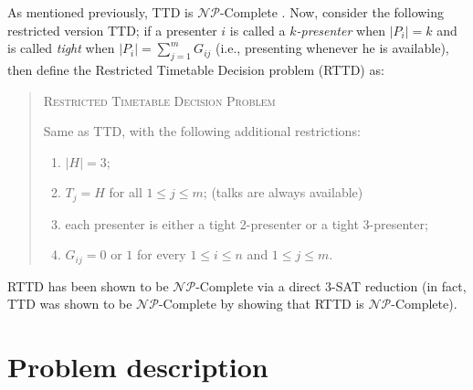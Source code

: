 \documentclass[]{article}
\theoremstyle{definition}
\theoremstyle{remark}
\numberwithin{equation}{section}
\newcommand{\cNP}{$\mathcal{NP}$}
\begin{document}
As mentioned previously, TTD is \cNP-Complete \cite{even76}. Now, consider the following restricted version TTD; if a presenter $i$ is called a $k$\textit{-presenter} when $|P_i|=k$ and is called \textit{tight} when $|P_i|=\sum\limits_{j=1}^{m} G_{ij}$ (i.e., presenting whenever he is available), then define the Restricted Timetable Decision problem (RTTD) as:
\begin{quote}
	\textsc{Restricted Timetable Decision Problem}
	
	Same as TTD, with the following additional restrictions:
	\begin{enumerate}
		\item $|H|=3$;
		\item $T_j = H$ for all $1 \le j \le m$; (talks are always available)
		\item each presenter is either a tight 2-presenter or a tight 3-presenter;
		\item $G_{ij}=0$ or $1$ for every $1 \le i \le n$ and $1 \le j \le m$.
	\end{enumerate}
\end{quote}
RTTD has been shown to be \cNP-Complete via a direct 3-SAT reduction \cite{even76} (in fact, TTD was shown to be \cNP-Complete by showing that RTTD is \cNP-Complete).

\section{Problem description}\label{sec.desc}
\end{document}
